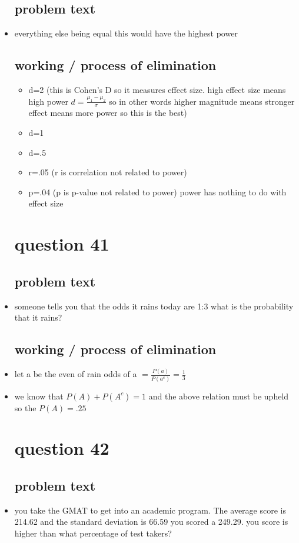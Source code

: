 \documentclass{article}
\begin{document}
\begin{itemize}
\subsection{problem text}
\item everything else being equal this would have the highest power
\subsection{working / process of elimination }
\begin{itemize}
    \item d=2 (this is Cohen's D so it measures effect size. high effect size means high power $d=\frac{\mu_1-\mu_2}{\sigma}$ so in other words higher magnitude means stronger effect means more power so this is the best)
    \item d=1
    \item d=.5
    \item r=.05 (r is correlation not related to power) 
    \item p=.04 (p is p-value not related to power)
    \itme power has nothing to do with effect size 
\end{itemize}

\section{question 41}
\subsection{problem text}
\item someone tells you that the odds it rains today are 1:3 what is the probability that it rains? 
\subsection{working / process of elimination }
\item let a be the even of rain odds of a $=\frac{P(a)}{P(a^c)}=\frac{1}{3}$
\item we know that $P(A)+P(A^c)=1$ and the above relation must be upheld so the $P(A)=.25$

\section{question 42}
\subsection{problem text}
\item you take the GMAT to get into an academic program. The average score is 214.62 and the standard deviation is 66.59 you scored a 249.29. you score is higher than what percentage of test takers? 

\end{itemize}
\end{document}
